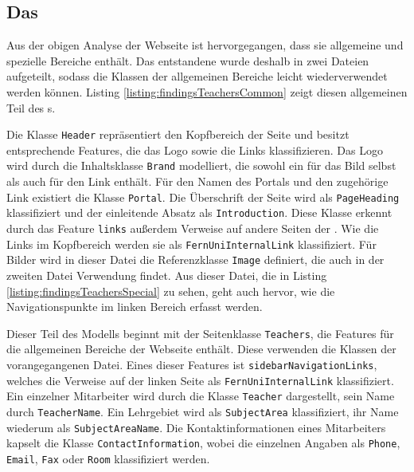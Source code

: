 \subsection{Das {\classificationModel}}
    \label{section:findingsTeachersClassificationModel}
    Aus der obigen Analyse der Webseite ist hervorgegangen,
    dass sie allgemeine und spezielle Bereiche enthält.
    Das entstandene {\classificationModel} wurde deshalb in zwei Dateien aufgeteilt,
    sodass die Klassen der allgemeinen Bereiche leicht wiederverwendet werden können.
    Listing \ref{listing:findingsTeachersCommon} zeigt diesen allgemeinen
    Teil des {\classificationModel}s.

    

    Die Klasse \texttt{Header} repräsentiert den Kopfbereich der Seite
    und besitzt entsprechende Features,
    die das Logo sowie die Links klassifizieren.
    Das Logo wird durch die Inhaltsklasse \texttt{Brand} modelliert,
    die sowohl ein {} für das Bild selbst als auch für den Link enthält.
    Für den Namen des Portals und den zugehörige Link existiert die Klasse \texttt{Portal}.
    Die Überschrift der Seite wird als \texttt{PageHeading} klassifiziert und
    der einleitende Absatz als \texttt{Introduction}.
    Diese Klasse erkennt durch das Feature \texttt{links} außerdem Verweise auf andere Seiten der {\fernUni}.
    Wie die Links im Kopfbereich werden sie als \texttt{FernUniInternalLink} klassifiziert.
    Für Bilder wird in dieser Datei die Referenzklasse \texttt{Image} definiert,
    die auch in der zweiten Datei Verwendung findet.
    Aus dieser Datei, die in Listing \ref{listing:findingsTeachersSpecial} zu sehen,
    geht auch hervor, wie die Navigationspunkte im linken Bereich erfasst werden.

    

    Dieser Teil des Modells beginnt mit der Seitenklasse \texttt{Teachers},
    die Features für die allgemeinen Bereiche der Webseite enthält.
    Diese verwenden die Klassen der vorangegangenen Datei.
    Eines dieser Features ist \texttt{sidebarNavigationLinks},
    welches die Verweise auf der linken Seite als \texttt{FernUniInternalLink}
    klassifiziert.
    Ein einzelner Mitarbeiter wird durch die Klasse \texttt{Teacher} dargestellt,
    sein Name durch \texttt{TeacherName}.
    Ein Lehrgebiet wird als \texttt{SubjectArea} klassifiziert,
    ihr Name wiederum als \texttt{SubjectAreaName}.
    Die Kontaktinformationen eines Mitarbeiters kapselt die Klasse \texttt{ContactInformation},
    wobei die einzelnen Angaben als \texttt{Phone}, \texttt{Email}, \texttt{Fax} oder \texttt{Room}
    klassifiziert werden.

